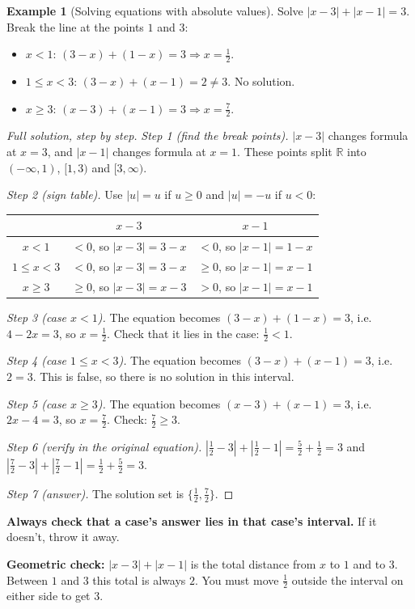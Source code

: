 \documentclass[11pt]{article}
\theoremstyle{definition}
\newtheorem{ex}[defn]{Example}
\newcommand{\R}{\mathbb{R}}
\newcommand{\key}[1]{\textcolor{red!70!black}{\textbf{#1}}}
\begin{document}
\begin{ex}[Solving equations with absolute values]
Solve $|x-3|+|x-1|=3$. Break the line at the points $1$ and $3$:
\begin{itemize}[nosep]
  \item $x<1$: $(3-x)+(1-x)=3\Rightarrow x=\frac12$. \checkmark
  \item $1\le x<3$: $(3-x)+(x-1)=2\ne3$. No solution.
  \item $x\ge3$: $(x-3)+(x-1)=3\Rightarrow x=\frac72$. \checkmark
\end{itemize}

\begin{proof}[Full solution, step by step]
\emph{Step 1 (find the break points).} $|x-3|$ changes formula at $x=3$,
and $|x-1|$ changes formula at $x=1$. These points split $\R$ into
$(-\infty,1)$, $[1,3)$ and $[3,\infty)$.

\emph{Step 2 (sign table).} Use $|u|=u$ if $u\ge0$ and $|u|=-u$ if $u<0$:
\begin{center}
\begin{tabular}{c|c|c}
 & $x-3$ & $x-1$\\ \hline
$x<1$ & $<0$, so $|x-3|=3-x$ & $<0$, so $|x-1|=1-x$\\
$1\le x<3$ & $<0$, so $|x-3|=3-x$ & $\ge0$, so $|x-1|=x-1$\\
$x\ge3$ & $\ge0$, so $|x-3|=x-3$ & $>0$, so $|x-1|=x-1$
\end{tabular}
\end{center}

\emph{Step 3 (case $x<1$).} The equation becomes $(3-x)+(1-x)=3$, i.e.\
$4-2x=3$, so $x=\frac12$. Check that it lies in the case: $\frac12<1$.
\checkmark

\emph{Step 4 (case $1\le x<3$).} The equation becomes $(3-x)+(x-1)=3$,
i.e.\ $2=3$. This is false, so there is no solution in this interval.

\emph{Step 5 (case $x\ge3$).} The equation becomes $(x-3)+(x-1)=3$, i.e.\
$2x-4=3$, so $x=\frac72$. Check: $\frac72\ge3$. \checkmark

\emph{Step 6 (verify in the original equation).}
$|\tfrac12-3|+|\tfrac12-1|=\tfrac52+\tfrac12=3$ and
$|\tfrac72-3|+|\tfrac72-1|=\tfrac12+\tfrac52=3$.

\emph{Step 7 (answer).} The solution set is $\{\frac12,\frac72\}$.
\end{proof}
\noindent\key{Always check that a case's answer lies in that case's
interval.} If it doesn't, throw it away.

\noindent\key{Geometric check:} $|x-3|+|x-1|$ is the total distance from
$x$ to $1$ and to $3$. Between $1$ and $3$ this total is always $2$. You
must move $\frac12$ outside the interval on either side to get $3$.
\end{ex}
\end{document}

